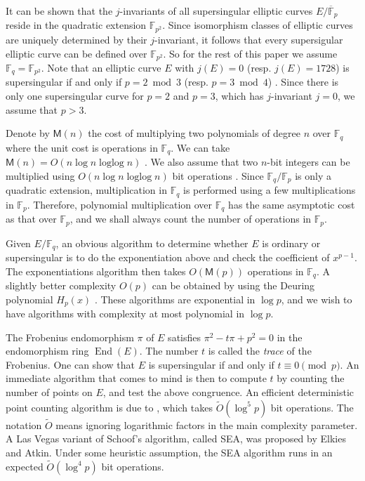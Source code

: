\documentclass[11pt]{article}
\theoremstyle{plain}
\theoremstyle{definition}
\newcommand{\tildO}{\tilde{O}}
\DeclareMathOperator{\ringofend}{End} %
\DeclareMathOperator{\loglog}{loglog}
\def\F{\ensuremath{\mathbb{F}}}
\def\MM{\ensuremath{\mathsf{M}}}
\begin{document}
It can be shown that the $j$-invariants of all supersingular elliptic curves $E / \overline{\F}_p$ 
reside in the quadratic extension $\F_{p^2}$. Since isomorphism classes of elliptic curves are 
uniquely determined by their $j$-invariant, it follows that every supersigular elliptic curve can 
be defined over $\F_{p^2}$. So for the rest of this paper we assume $\F_q = \F_{p^2}$. Note that 
an elliptic curve $E$ with $j(E) = 0$ (resp. $j(E) = 1728$) is supersingular if and only if $p = 2 
\bmod 3$ (resp. $p = 3 \bmod 4$) \cite[Theorem 4.1.c]{silverman2009arithmetic}. Since there is only 
one supersingular curve for $p = 2$ and $p = 3$, which has $j$-invariant $j = 0$, we assume that $p 
> 3$. 

Denote by $\MM(n)$ the cost of multiplying two polynomials of degree $n$ over $\F_q$ where the unit 
cost is operations in $\F_q$. We can take $\MM(n) = O(n\log n \loglog n)$ \cite{vzGG}. We also 
assume that two $n$-bit integers can be multiplied using $O(n\log n \loglog n)$ bit operations 
\cite{vzGG}. Since $\F_q / \F_p$ is only a quadratic extension, multiplication in $\F_q$ is 
performed using a few multiplications in $\F_p$. Therefore, polynomial multiplication over $\F_q$ 
has the same asymptotic cost as that over $\F_p$, and we shall always count the number of 
operations in $\F_p$.

Given $E / \F_q$, an obvious algorithm to determine whether $E$ is ordinary or supersingular is to 
do the exponentiation above and check the coefficient of $x^{p - 1}$. The exponentiations algorithm 
then takes $O(\MM(p))$ operations in $\F_q$. A slightly better complexity $O(p)$ can be obtained by 
using the Deuring polynomial $H_p(x)$ \cite[Theorem 4.1.b]{silverman2009arithmetic}. These 
algorithms are exponential in $\log p$, and we wish to have algorithms with complexity at most 
polynomial in $\log p$.

The Frobenius endomorphism $\pi$ of $E$ satisfies $\pi^2 - t\pi + p^2 = 0$ in the endomorphism ring 
$\ringofend(E)$. The number $t$ is called the \textit{trace} of the Frobenius. One can show that 
$E$ is supersingular if and only if $t \equiv 0 \pmod{p}$. An immediate algorithm that comes to 
mind is then to compute $t$ by counting the number of points on $E$, and test the above congruence. 
An efficient deterministic point counting algorithm is due to \cite{schoof85}, which takes 
$\tildO(\log^5 p)$ bit operations. The notation $\tildO$ means ignoring logarithmic factors in the 
main complexity parameter. A Las Vegas variant of Schoof's algorithm, called SEA, was proposed by 
Elkies and Atkin. Under some heuristic assumption, the SEA algorithm runs in an expected 
$\tildO(\log^4p)$ bit operations.  
\end{document}
